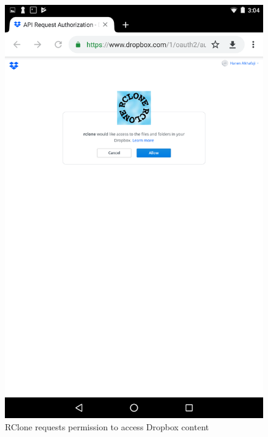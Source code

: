 \begin{figure}[htb]
  \centering
  \includegraphics[scale=0.2]{images/dropbox2.png}
  \caption{RClone requests permission to access Dropbox content}
  \label{fig:dropbox2}
\end{figure}
